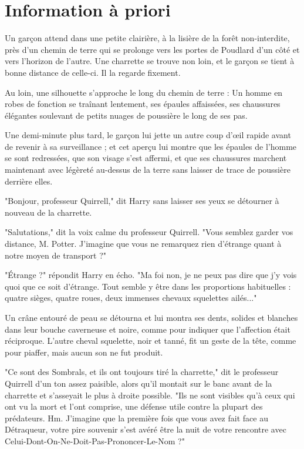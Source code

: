 
\chapter{Information à priori}

Un garçon attend dans une petite clairière, à la lisière de la forêt non-interdite, près d'un chemin de terre qui se prolonge vers les portes de Poudlard d'un côté et vers l'horizon de l'autre. Une charrette se trouve non loin, et le garçon se tient à bonne distance de celle-ci. Il la regarde fixement.

Au loin, une silhouette s'approche le long du chemin de terre : Un homme en robes de fonction se traînant lentement, ses épaules affaissées, ses chaussures élégantes soulevant de petits nuages de poussière le long de ses pas.

Une demi-minute plus tard, le garçon lui jette un autre coup d'œil rapide avant de revenir à sa surveillance ; et cet aperçu lui montre que les épaules de l'homme se sont redressées, que son visage s'est affermi, et que ses chaussures marchent maintenant avec légèreté au-dessus de la terre sans laisser de trace de poussière derrière elles.

"Bonjour, professeur Quirrell," dit Harry sans laisser ses yeux se détourner à nouveau de la charrette.

"Salutations," dit la voix calme du professeur Quirrell. "Vous semblez garder vos distance, M. Potter. J'imagine que vous ne remarquez rien d'étrange quant à notre moyen de transport ?"

"Étrange ?" répondit Harry en écho. "Ma foi non, je ne peux pas dire que j'y vois quoi que ce soit d'étrange. Tout semble y être dans les proportions habituelles : quatre sièges, quatre roues, deux immenses chevaux squelettes ailés..."

Un crâne entouré de peau se détourna et lui montra ses dents, solides et blanches dans leur bouche caverneuse et noire, comme pour indiquer que l'affection était réciproque. L'autre cheval squelette, noir et tanné, fit un geste de la tête, comme pour piaffer, mais aucun son ne fut produit.

"Ce sont des Sombrals, et ils ont toujours tiré la charrette," dit le professeur Quirrell d'un ton assez paisible, alors qu'il montait sur le banc avant de la charrette et s'asseyait le plus à droite possible. "Ils ne sont visibles qu'à ceux qui ont vu la mort et l'ont comprise, une défense utile contre la plupart des prédateurs. Hm. J'imagine que la première fois que vous avez fait face au Détraqueur, votre pire souvenir s'est avéré être la nuit de votre rencontre avec Celui-Dont-On-Ne-Doit-Pas-Prononcer-Le-Nom ?"


